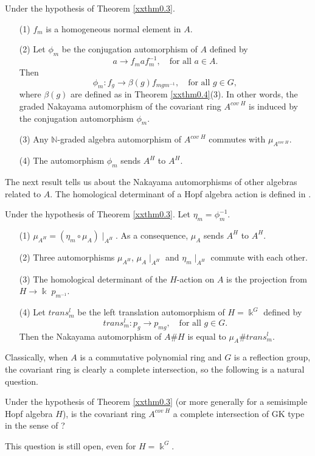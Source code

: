 \begin{theorem}
\label{xxthm0.5} Under the hypothesis of Theorem {\rm{\ref{xxthm0.3}}}.
\begin{enumerate}
\item[(1)]
$f_m$ is a homogeneous normal element in $A$.  
\item[(2)]
Let $\phi_m$ be the conjugation 
automorphism of $A$ defined by
$$a\to f_{m} a f_{m}^{-1}, \quad {\text{for all $a\in A$.}}$$
Then 
$$\phi_m: f_g\to \beta(g) f_{mgm^{-1}}, \quad {\text{for all $g\in G$}},$$
where $\beta(g)$ are defined as in Theorem {\rm{\ref{xxthm0.4}(3)}}.
In other words, the graded Nakayama automorphism of the covariant ring
$A^{cov\; H}$ is induced by the conjugation automorphism $\phi_m$.
\item[(3)]
Any ${\mathbb N}$-graded algebra automorphism of $A^{cov\; H}$ 
commutes with $\mu_{A^{cov\; H}}$. 
\item[(4)]
The automorphism $\phi_m$ sends $A^H$ to $A^H$. 
\end{enumerate}
\end{theorem}

The next result tells us about the Nakayama automorphisms
of other algebras related to $A$. The homological determinant of a Hopf
algebra action is defined in \cite[Definition 3.3]{KKZ3}.

\begin{theorem}
\label{xxthm0.6} 
Under the hypothesis of Theorem {\rm{\ref{xxthm0.3}}}. 
Let $\eta_m=\phi_{m}^{-1}$. 
\begin{enumerate}
\item[(1)]
$\mu_{A^H}=(\eta_{m} \circ \mu_{A})\mid_{A^H}$.
As a consequence, $\mu_A$ sends $A^H$ to $A^H$.
\item[(2)]
Three automorphisms $\mu_{A^H}$, $\mu_{A}\mid_{A^H}$ and $\eta_{m}\mid_{A^H}$
commute with each other.
\item[(3)]
The homological determinant of the $H$-action on $A$
is the projection from $H\to \Bbbk \; p_{m^{-1}}$. 
\item[(4)]
Let $trans^l_{m}$ be the left translation automorphism 
of $H=\Bbbk^G$ defined by 
$$trans^l_{m}: p_g \to p_{mg},
\quad {\text{for all $g\in G$.}}$$ 
Then the Nakayama automorphism
of $A\# H$ is equal to $\mu_A \# trans^l_{m}$.
\end{enumerate}
\end{theorem}
 
Classically, when $A$ is a commutative polynomial ring and $G$ is a reflection
group, the covariant ring is clearly a complete intersection,
so the following is a natural question.  
\begin{question}
\label{xxque0.7}
Under the hypothesis of Theorem \ref{xxthm0.3} (or more generally for a semisimple Hopf algebra $H$), is 
the covariant ring 
$A^{cov \; H}$ a complete intersection of GK type
in the sense of \cite{KKZ4}?
\end{question}
This question is still open, even for $H = \Bbbk^G$.

